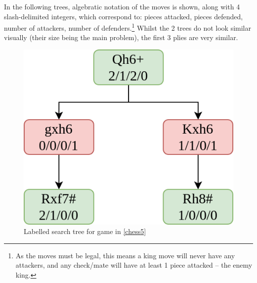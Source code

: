 In the following trees, algebratic notation of the moves is shown, along with 4
slash-delimited integers, which correspond to: pieces attacked, pieces
defended, number of attackers, number of defenders.\footnote{As the moves must
be legal, this means a king move will never have any attackers, and any
check/mate will have at least 1 piece attacked -- the enemy king.} Whilst the 2
trees do not look similar visually (their size being the main problem), the
first 3 plies are very similar. 

\begin{figure}[H]
  \begin{minipage}{0.475\textwidth}
    \centering
    \includegraphics[width=\textwidth]{project/img/trees/1.drawio.png}
    \caption{Labelled search tree for game in \ref{chess5}}
    \label{tree1}
  \end{minipage}
  \hspace{0.05\textwidth}
  \begin{minipage}{0.475\textwidth}
    \centering

\end{minipage}
\end{figure}
